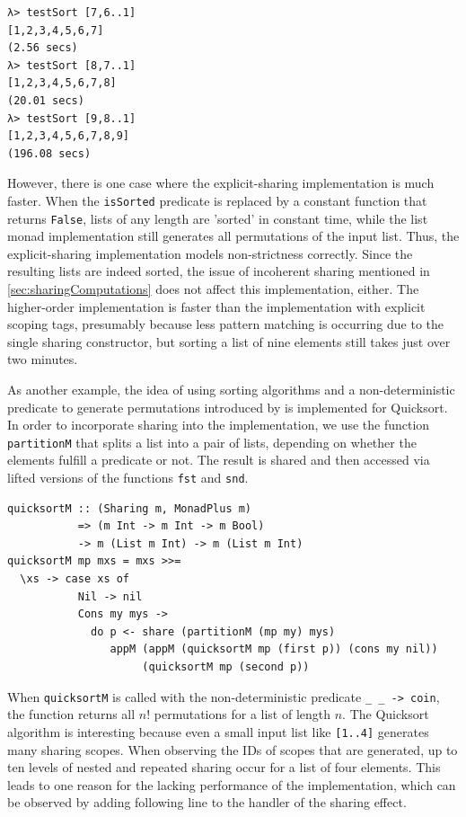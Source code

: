 \documentclass[a4paper, 11pt, fleqn, twoside]{scrreprt}
\newcommand{\hinl}[1]{\texttt{#1}}
\begin{document}
\begin{verbatim}
λ> testSort [7,6..1]
[1,2,3,4,5,6,7]
(2.56 secs)
λ> testSort [8,7..1]
[1,2,3,4,5,6,7,8]
(20.01 secs)
λ> testSort [9,8..1]
[1,2,3,4,5,6,7,8,9]
(196.08 secs)
\end{verbatim}

However, there is one case where the explicit-sharing implementation is much faster.
When the \hinl{isSorted} predicate is replaced by a constant function that returns \hinl{False}, lists of any length are 'sorted' in constant time, while the list monad implementation still generates all permutations of the input list.
Thus, the explicit-sharing implementation models non-strictness correctly.
Since the resulting lists are indeed sorted, the issue of incoherent sharing mentioned in \autoref{sec:sharingComputations} does not affect this implementation, either.
The higher-order implementation is faster than the implementation with explicit scoping tags, presumably because less pattern matching is occurring due to the single sharing constructor, but sorting a list of nine elements still takes just over two minutes.

As another example, the idea of using sorting algorithms and a non-deterministic predicate to generate permutations introduced by \citet{Christiansen2016allsorts} is implemented for Quicksort.
In order to incorporate sharing into the implementation, we use the function \hinl{partitionM} that splits a list into a pair of lists, depending on whether the elements fulfill a predicate or not.
The result is shared and then accessed via lifted versions of the functions \hinl{fst} and \hinl{snd}.

\begin{verbatim}
quicksortM :: (Sharing m, MonadPlus m) 
           => (m Int -> m Int -> m Bool) 
           -> m (List m Int) -> m (List m Int)
quicksortM mp mxs = mxs >>=
  \xs -> case xs of
           Nil -> nil
           Cons my mys ->
             do p <- share (partitionM (mp my) mys)
                appM (appM (quicksortM mp (first p)) (cons my nil)) 
                     (quicksortM mp (second p))
\end{verbatim}

When \hinl{quicksortM} is called with the non-deterministic predicate \hinl{\_ _ -> coin}, the function returns all $n!$ permutations for a list of length $n$.
The Quicksort algorithm is interesting because even a small input list like \hinl{[1..4]} generates many sharing scopes.
When observing the IDs of scopes that are generated, up to ten levels of nested and repeated sharing occur for a list of four elements.
This leads to one reason for the lacking performance of the implementation, which can be observed by adding following line to the handler of the sharing effect.
\end{document}
